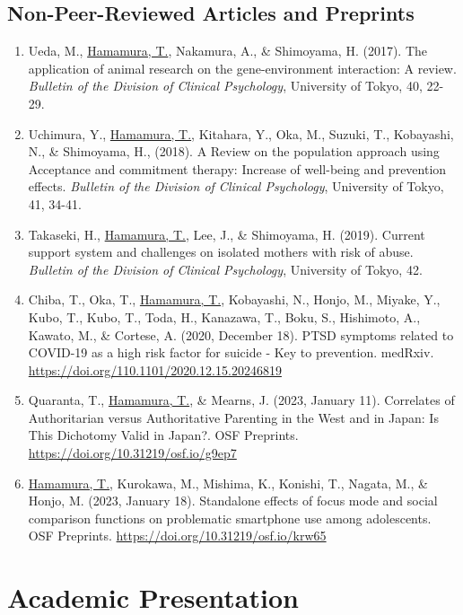 \documentclass[a4paper]{article}
\begin{document}
\subsection{Non-Peer-Reviewed Articles and Preprints}
\begin{enumerate}
	\item Ueda, M., \underline{Hamamura, T.}, Nakamura, A., \& Shimoyama, H. (2017). The application of animal research on the gene-environment interaction: A review. \textit{Bulletin of the Division of Clinical Psychology}, University of Tokyo, 40, 22-29.
	\item Uchimura, Y., \underline{Hamamura, T.}, Kitahara, Y., Oka, M., Suzuki, T., Kobayashi, N., \& Shimoyama, H., (2018). A Review on the population approach using Acceptance and commitment therapy: Increase of well-being and prevention effects. \textit{Bulletin of the Division of Clinical Psychology}, University of Tokyo, 41, 34-41.
	\item Takaseki, H., \underline{Hamamura, T.}, Lee, J., \& Shimoyama, H. (2019). Current support system and challenges on isolated mothers with risk of abuse. \textit{Bulletin of the Division of Clinical Psychology}, University of Tokyo, 42.
	\item Chiba, T., Oka, T., \underline{Hamamura, T.}, Kobayashi, N., Honjo, M., Miyake, Y., Kubo, T., Kubo, T., Toda, H., Kanazawa, T., Boku, S., Hishimoto, A., Kawato, M., \& Cortese, A. (2020, December 18). PTSD symptoms related to COVID-19 as a high risk factor for suicide - Key to prevention. medRxiv. \url{https://doi.org/110.1101/2020.12.15.20246819}
	\item Quaranta, T., \underline{Hamamura, T.}, \& Mearns, J. (2023, January 11). Correlates of Authoritarian versus Authoritative Parenting in the West and in Japan: Is This Dichotomy Valid in Japan?. OSF Preprints. \url{https://doi.org/10.31219/osf.io/g9ep7}
	\item \underline{Hamamura, T.}, Kurokawa, M., Mishima, K., Konishi, T., Nagata, M., \& Honjo, M. (2023, January 18). Standalone effects of focus mode and social comparison functions on problematic smartphone use among adolescents. OSF Preprints. \url{https://doi.org/10.31219/osf.io/krw65}
\end{enumerate}
	 
\section{Academic Presentation}
\end{document}
